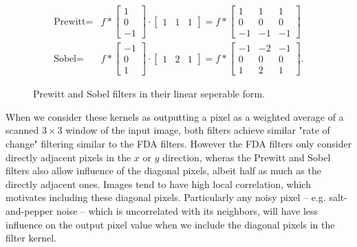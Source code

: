 \begin{figure}[H]
	\begin{align}
		\text{Prewitt}
		=&f
		*\begin{bmatrix}
			1 \\
			0 \\
			-1
		\end{bmatrix}
		\cdot\begin{bmatrix}
			1 & 1 & 1
		\end{bmatrix}
		=
		f*
		\begin{bmatrix}
			1 & 1 & 1 \\
			0 & 0 & 0 \\
			-1 & -1 & -1
		\end{bmatrix}
		\\
		\text{Sobel}
		=&f
		*\begin{bmatrix}
			-1 \\
			0 \\
			1
		\end{bmatrix}
		\cdot\begin{bmatrix}
			1 & 2 & 1
		\end{bmatrix}
		=
		f*
		\begin{bmatrix}
			-1 & -2 & -1 \\
			0 & 0 & 0 \\
			1 & 2 & 1
		\end{bmatrix}.
	\end{align}
	\caption{Prewitt and Sobel filters in their linear seperable form.}
\end{figure}
When we consider these kernels as outputting a pixel as a weighted average of a scanned $3\times 3$ window of the input image,
both filters achieve similar "rate of change" filtering similar to the FDA filters.
However the FDA filters only consider directly adjacent pixels in the $x$ or $y$ direction,
wheras the Prewitt and Sobel filters also allow influence of the diagonal pixels, albeit half as much as the directly adjacent ones.
Images tend to have high local correlation, which motivates including these diagonal pixels.
Particularly any noisy pixel -- e.g. salt-and-pepper noise -- which is uncorrelated with its neighbors,
will have less influence on the output pixel value when we include the diagonal pixels in the filter kernel.
